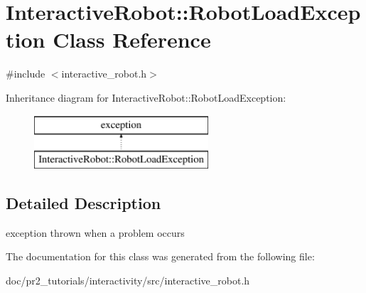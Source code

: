\section{Interactive\-Robot\-:\-:Robot\-Load\-Exception Class Reference}
\label{class_interactive_robot_1_1_robot_load_exception}


{\ttfamily \#include $<$interactive\-\_\-robot.\-h$>$}

Inheritance diagram for Interactive\-Robot\-:\-:Robot\-Load\-Exception\-:\begin{figure}[H]
\begin{center}
\leavevmode
\includegraphics[height=2.000000cm]{class_interactive_robot_1_1_robot_load_exception}
\end{center}
\end{figure}


\subsection{Detailed Description}
exception thrown when a problem occurs 

The documentation for this class was generated from the following file\-:\begin{DoxyCompactItemize}
\item 
doc/pr2\-\_\-tutorials/interactivity/src/interactive\-\_\-robot.\-h\end{DoxyCompactItemize}
